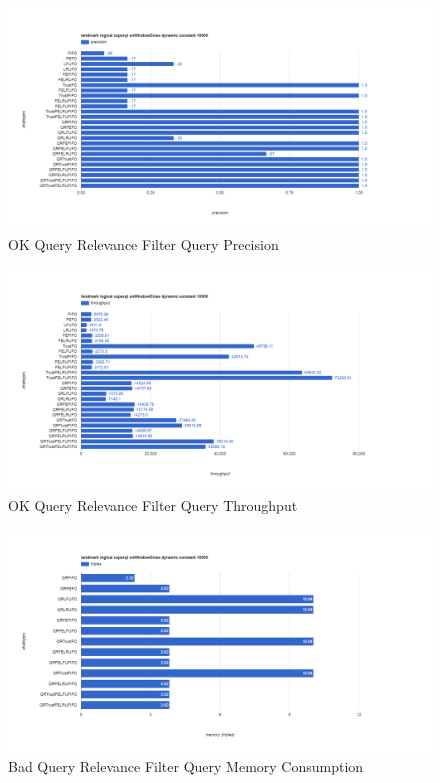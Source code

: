 \begin{figure}[!htbp]
	\centering
    \includegraphics[width=6.5in]{img/app3-oqr-p.png}
    \caption{OK Query Relevance Filter Query Precision}
\end{figure}
\begin{figure}[!htbp]
	\centering
    \includegraphics[width=6.5in]{img/app3-oqr-t.png}
    \caption{OK Query Relevance Filter Query Throughput}
\end{figure}
\begin{figure}[!htbp]
	\centering
    \includegraphics[width=6.5in]{img/app3-bqr-m.png}
    \caption{Bad Query Relevance Filter Query Memory Consumption}
\end{figure}

